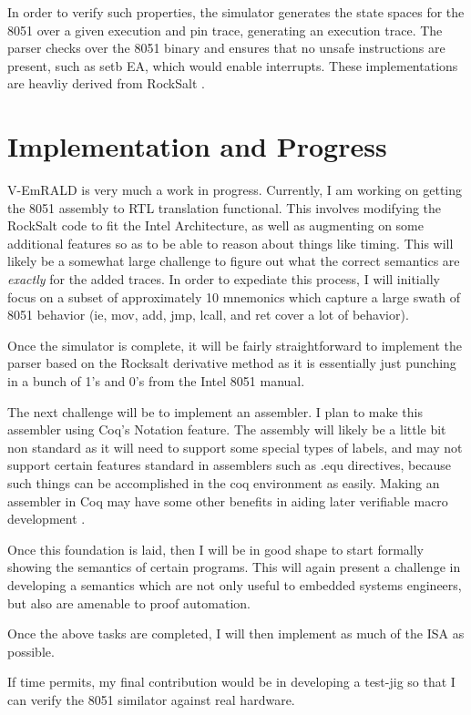 \documentclass[preprint,11pt]{sigplanconf}
\begin{document}
In order to verify such properties, the simulator generates the state
spaces for the 8051 over a given execution and pin trace, generating
an execution trace.  The parser checks over the 8051 binary and
ensures that no unsafe instructions are present, such as setb EA,
which would enable interrupts.  These implementations are heavliy
derived from RockSalt \cite{rocksalt}.
\section{Implementation and Progress}
V-EmRALD is very much a work in progress. Currently, I am working on
getting the 8051 assembly to RTL translation functional. This involves
modifying the RockSalt code to fit the Intel Architecture, as well as
augmenting on some additional features so as to be able to reason
about things like timing. This will likely be a somewhat large
challenge to figure out what the correct semantics are \emph{exactly}
for the added traces. In order to expediate this process, I will
initially focus on a subset of approximately 10 mnemonics which
capture a large swath of 8051 behavior (ie, mov, add, jmp, lcall, and
ret cover a lot of behavior).

Once the simulator is complete, it will be fairly straightforward to
implement the parser based on the Rocksalt derivative method as it is
essentially just punching in a bunch of 1's and 0's from the Intel 8051
manual.

The next challenge will be to implement an assembler. I plan to make
this assembler using Coq's Notation feature. The assembly will likely
be a little bit non standard as it will need to support some special
types of labels, and may not support certain features standard in
assemblers such as .equ directives, because such things can be
accomplished in the coq environment as easily. Making an assembler in
Coq may have some other benefits in aiding later verifiable macro
development \cite{coqasm}.

Once this foundation is laid, then I will be in good shape to start
formally showing the semantics of certain programs. This will again
present a challenge in developing a semantics which are not only
useful to embedded systems engineers, but also are amenable to proof
automation.

Once the above tasks are completed, I will then implement as much of
the ISA as possible.

If time permits, my final contribution would be in developing a
test-jig so that I can verify the 8051 similator against
real hardware.
\end{document}
